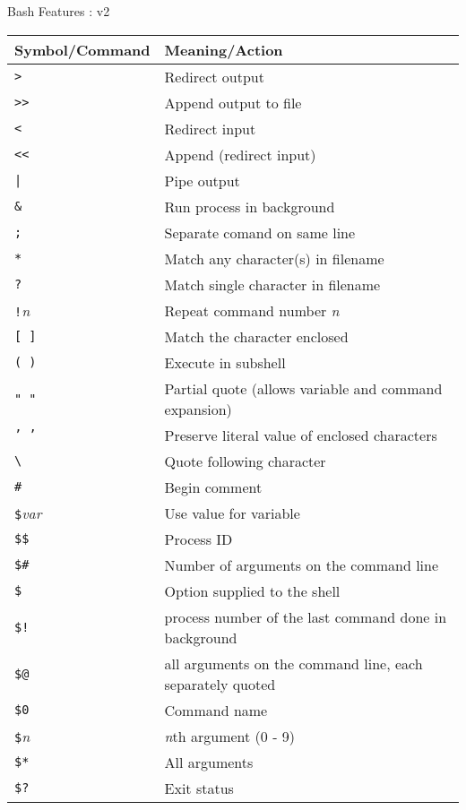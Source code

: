 \documentclass{article}
\begin{document}
\titlepage                      
Bash Features : v2
\begin{center}
\begin{tabular}{|l|l|}
  \hline
  \textbf{Symbol/Command} & \textbf{Meaning/Action}\\ 
  \hline
  \texttt{>}	 &	Redirect output\\
  \hline		
  \texttt{>>}	 &	Append output to file\\
  \hline		
  \texttt{<}	 &	Redirect input\\
  \hline		
  \texttt{<<}	 &	Append (redirect input) \\
  \hline		
  \texttt{|}	 &	Pipe output\\
  \hline		
  \texttt{\&}	 &	Run process in background\\
  \hline		
  \texttt{;}	 &	Separate comand on same line\\
  \hline		
  \texttt{*}	 &	Match any character(s) in filename\\
  \hline		
  \texttt{?}	 &	Match single character in filename\\
  \hline		
  \texttt{!}\textsl{n}	 &	Repeat command number \textsl{n}\\
  \hline
  \texttt{[ ]}	 &	Match the character enclosed\\
  \hline		
  \texttt{( )}	& Execute  in subshell\\
  \hline
  \texttt{" "}	& Partial quote (allows variable and command expansion)\\
  \hline
  \texttt{' '}	& Preserve literal value of enclosed characters\\
  \hline
  \texttt{\textbackslash} & Quote following character\\
  \hline
  \texttt{\#} & 	Begin comment\\
  \hline
  \texttt{\$}\textsl{var} & 	Use value for variable\\
  \hline
  \texttt{\$\$} & 	Process ID\\
  \hline
  \texttt{\$\#} & 	Number of arguments on the command line\\
  \hline
  \texttt{\$\-} & 	Option supplied to the shell\\
  \hline
  \texttt{\$!} & 	process number of the last command done in background\\
  \hline
  \texttt{\$@} & all arguments on the command line, each separately  quoted \\
  \hline
  \texttt{\$0} & Command name\\
  \hline
  \texttt{\$}\textsl{n}   & 	\textsl{n}th argument (0 - 9)    \\
  \hline
  \texttt{\$*} & 	All arguments\\
  \hline
  \texttt{\$?} & 	Exit status\\


\end{tabular}
\end{center}
\end{document}
